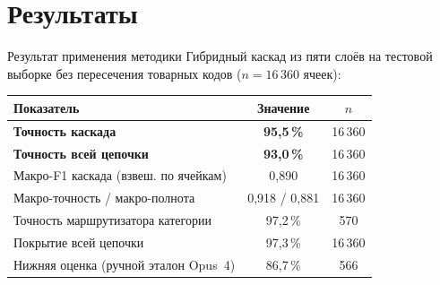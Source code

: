 \documentclass[aspectratio=169, 14pt]{beamer}
\newcommand{\pos}[1]{{\color{posgreen}#1}}
\begin{document}
\section{Результаты}

\begin{frame}{Результат применения методики}
\centering
\fontsize{10.5pt}{13pt}\selectfont
Гибридный каскад из пяти слоёв на тестовой выборке без пересечения
товарных кодов ($n = 16\,360$ ячеек):

\vspace{0.5em}
\fontsize{10pt}{12.5pt}\selectfont
\setlength{\tabcolsep}{9pt}
\renewcommand{\arraystretch}{1.18}
\begin{tabular}{lcc}
\toprule
\textbf{Показатель} & \textbf{Значение} & \textbf{$n$} \\
\midrule
\rowcolor{green!12}
\textbf{Точность каскада}                     & \pos{\textbf{95{,}5\,\%}} & 16\,360 \\
\rowcolor{green!12}
\textbf{Точность всей цепочки}                 & \pos{\textbf{93{,}0\,\%}} & 16\,360 \\
\midrule
Макро-F1 каскада (взвеш. по ячейкам)        & 0{,}890               & 16\,360 \\
Макро-точность / макро-полнота              & 0{,}918 / 0{,}881     & 16\,360 \\
Точность маршрутизатора категории           & 97{,}2\,\%            & 570     \\
Покрытие всей цепочки                       & 97{,}3\,\%            & 16\,360 \\
\midrule
Нижняя оценка (ручной эталон Opus~4)        & 86{,}7\,\%            & 566     \\
\bottomrule
\end{tabular}

\end{frame}
\end{document}
